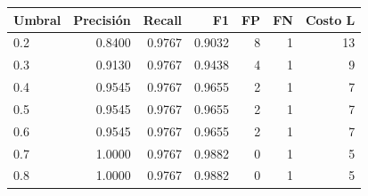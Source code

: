 \begin{tabular}{lrrrrrr}
\toprule
Umbral & Precisión & Recall & F1 & FP & FN & Costo L \\
\midrule
0.2 & 0.8400 & 0.9767 & 0.9032 & 8 & 1 & 13 \\
0.3 & 0.9130 & 0.9767 & 0.9438 & 4 & 1 & 9 \\
0.4 & 0.9545 & 0.9767 & 0.9655 & 2 & 1 & 7 \\
0.5 & 0.9545 & 0.9767 & 0.9655 & 2 & 1 & 7 \\
0.6 & 0.9545 & 0.9767 & 0.9655 & 2 & 1 & 7 \\
0.7 & 1.0000 & 0.9767 & 0.9882 & 0 & 1 & 5 \\
0.8 & 1.0000 & 0.9767 & 0.9882 & 0 & 1 & 5 \\
\bottomrule
\end{tabular}
